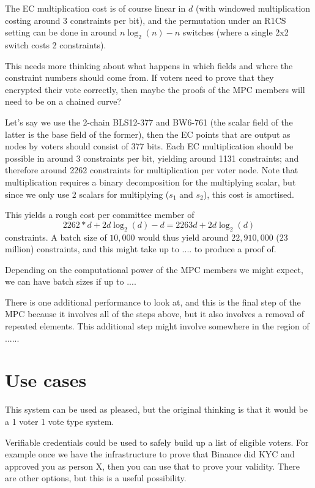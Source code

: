 \documentclass{article}
\begin{document}
The EC multiplication cost is of course linear in $d$ (with windowed multiplication costing around 3 constraints per bit), and the permutation under an R1CS setting can be done in around $n\log_2(n)-n$ switches (where a single 2x2 switch costs 2 constraints).

This needs more thinking about what happens in which fields and where the constraint numbers should come from. If voters need to prove that they encrypted their vote correctly, then maybe the proofs of the MPC members will need to be on a chained curve?

Let's say we use the 2-chain BLS12-377 and BW6-761 (the scalar field of the latter is the base field of the former), then the EC points that are output as nodes by voters should consist of 377 bits. Each EC multiplication should be possible in around 3 constraints per bit, yielding around 1131 constraints; and therefore around 2262 constraints for multiplication per voter node. Note that multiplication requires a binary decomposition for the multiplying scalar, but since we only use 2 scalars for multiplying ($s_1$ and $s_2$), this cost is amortised.

This yields a rough cost per committee member of
$$ 2262*d + 2d\log_2(d) - d = 2263d + 2d\log_2(d)
$$ 
constraints. A batch size of $10,000$ would thus yield around $22,910,000$ ($23$ million) constraints, and this might take up to .... to produce a proof of.

Depending on the computational power of the MPC members we might expect, we can have batch sizes if up to ....

There is one additional performance to look at, and this is the final step of the MPC because it involves all of the steps above, but it also involves a removal of repeated elements. This additional step might involve somewhere in the region of ......


\section{Use cases}
This system can be used as pleased, but the original thinking is that it would be a 1 voter 1 vote type system. 

Verifiable credentials could be used to safely build up a list of eligible voters. For example once we have the infrastructure to prove that Binance did KYC and approved you as person X, then you can use that to prove your validity. There are other options, but this is a useful possibility.
\end{document}
